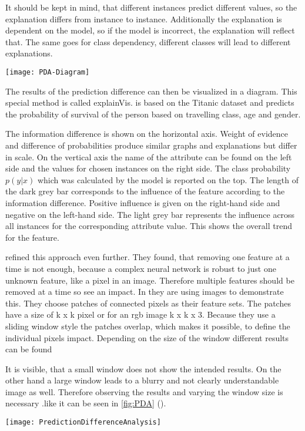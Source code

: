 It should be kept in mind, that different instances predict different values, so the explanation differs from instance to instance. Additionally the explanation is dependent on the model, so if the model is incorrect, the explanation will reflect that. The same goes for class dependency, different classes will lead to different explanations.
\begin{figure*}[h]
    \center
    \texttt{[image: PDA-Diagram]}
    \caption{Prediction Difference Analysis on Titanic-dataset, \cite{RobnikSikonja.2008}}
    \label{fig:PDA-titanic}
\end{figure*}
The results of the prediction difference can then be visualized in a diagram. This special method is called explainVis.  is based on the Titanic dataset and predicts the probability of survival of the person based on travelling class, age and gender.
\par
The information difference is shown on the horizontal axis. Weight of evidence and difference of probabilities produce similar graphs and explanations but differ in scale. On the vertical axis the name of the attribute can be found on the left side and the values for chosen instances on the right side. The class probability 
\(p(y|x)\)
 which was calculated by the model is reported on the top.
The length of the dark grey bar corresponds to the influence of the feature according to the information difference. Positive influence is given on the right-hand side and negative on the left-hand side. The light grey bar represents the influence across all instances for the corresponding attribute value. This shows the overall trend for the feature.
\par
{} refined this approach even further. They found, that removing one feature at a time is not enough, because a complex neural network is robust to just one unknown feature, like a pixel in an image. Therefore multiple features should be removed at a time so see an impact. In \cite{Zintgraf.2017} they are using images to demonstrate this. They choose patches of connected pixels as their feature sets. The patches have a size of k x k pixel or for an rgb image k x k x 3. Because they use a sliding window style the patches overlap, which makes it possible, to define the individual pixels impact. Depending on the size of the window different results can be found 
\par
It is visible, that a small window does not show the intended results. On the other hand a large window leads to a blurry and not clearly understandable image as well. Therefore observing the results and varying the window size is necessary .like it can be seen in \cref{fig:PDA} (\cite{Zintgraf.2017}). 
\begin{figure*}[h]
    \center
    \texttt{[image: PredictionDifferenceAnalysis]}
    \caption{Prediction Difference Analysis with different window sizes, \cite{Zintgraf.2017}}
    \label{fig:PDA}
\end{figure*}

